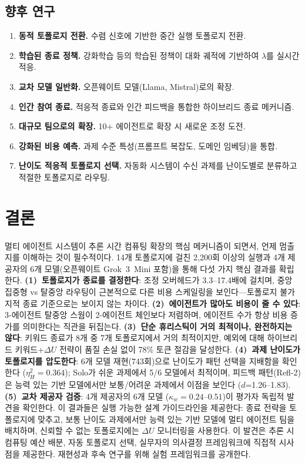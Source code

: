 \documentclass[a4paper,11pt]{article}
\begin{document}
\subsection{향후 연구}

\begin{enumerate}
\item \textbf{동적 토폴로지 전환.} 수렴 신호에 기반한 중간 실행 토폴로지 전환.
\item \textbf{학습된 종료 정책.} 강화학습 등의 학습된 정책이 대화 궤적에 기반하여 $\lambda$를 실시간 적응.
\item \textbf{교차 모델 일반화.} 오픈웨이트 모델(Llama, Mistral)로의 확장.
\item \textbf{인간 참여 종료.} 적응적 종료와 인간 피드백을 통합한 하이브리드 종료 메커니즘.
\item \textbf{대규모 팀으로의 확장.} 10+ 에이전트로 확장 시 새로운 조정 도전.
\item \textbf{강화된 비용 예측.} 과제 수준 특성(프롬프트 복잡도, 도메인 임베딩)을 통합.
\item \textbf{난이도 적응적 토폴로지 선택.} 자동화 시스템이 수신 과제를 난이도별로 분류하고 적절한 토폴로지로 라우팅.
\end{enumerate}

\section{결론}
\label{sec:conclusion}

멀티 에이전트 시스템이 추론 시간 컴퓨팅 확장의 핵심 메커니즘이 되면서, 언제 멈출지를 이해하는 것이 필수적이다. 14개 토폴로지에 걸친 2,200회 이상의 실행과 4개 제공자의 6개 모델(오픈웨이트 Grok~3~Mini 포함)을 통해 다섯 가지 핵심 결과를 확립한다. \textbf{(1)~토폴로지가 종료를 결정한다}: 조정 오버헤드가 3.3--17.4배에 걸치며, 중앙 집중형 vs 탈중앙 라우팅이 근본적으로 다른 비용 스케일링을 보인다---토폴로지 불가지적 종료 기준으로는 보이지 않는 차이다. \textbf{(2)~에이전트가 많아도 비용이 줄 수 있다}: 3-에이전트 탈중앙 스웜이 2-에이전트 체인보다 저렴하며, 에이전트 수가 항상 비용 증가를 의미한다는 직관을 뒤집는다. \textbf{(3)~단순 휴리스틱이 거의 최적이나, 완전하지는 않다}: 키워드 종료가 8개 중 7개 토폴로지에서 거의 최적이지만, 예외에 대해 하이브리드 키워드+$\Delta U$ 전략이 품질 손실 없이 78\% 토큰 절감을 달성한다. \textbf{(4)~과제 난이도가 토폴로지를 압도한다}: 6개 모델 재현(743회)으로 난이도가 패턴 선택을 지배함을 확인한다 ($\eta^{2}_{H}=0.364$); Solo가 쉬운 과제에서 5/6 모델에서 최적이며, 피드백 패턴(Refl-2)은 능력 있는 기반 모델에서만 보통/어려운 과제에서 이점을 보인다 ($d$=1.26--1.83). \textbf{(5)~교차 제공자 검증}: 4개 제공자의 6개 모델 ($\kappa_w=0.24$--$0.51$)이 평가자 독립적 발견을 확인한다. 이 결과들은 실행 가능한 설계 가이드라인을 제공한다: 종료 전략을 토폴로지에 맞추고, 보통 난이도 과제에서만 능력 있는 기반 모델에 멀티 에이전트 팀을 배치하며, 신뢰할 수 없는 토폴로지에는 $\Delta U$ 모니터링을 사용한다. 이 발견은 추론 시 컴퓨팅 예산 배분, 자동 토폴로지 선택, 실무자의 의사결정 프레임워크에 직접적 시사점을 제공한다. 재현성과 후속 연구를 위해 실험 프레임워크를 공개한다.
\end{document}
